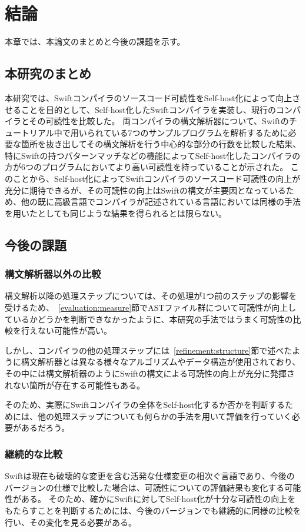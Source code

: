 \chapter{結論}
\label{conclusion}

本章では、本論文のまとめと今後の課題を示す。

\section{本研究のまとめ}

本研究では、Swiftコンパイラのソースコード可読性をSelf-host化によって向上させることを目的として、Self-host化したSwiftコンパイラを実装し、現行のコンパイラとその可読性を比較した。
両コンパイラの構文解析器について、Swiftのチュートリアル中で用いられている7つのサンプルプログラムを解析するために必要な箇所を抜き出してその構文解析を行う中心的な部分の行数を比較した結果、特にSwiftの持つパターンマッチなどの機能によってSelf-host化したコンパイラの方が6つのプログラムにおいてより高い可読性を持っていることが示された。
このことから、Self-host化によってSwiftコンパイラのソースコード可読性の向上が充分に期待できるが、その可読性の向上はSwiftの構文が主要因となっているため、他の既に高級言語でコンパイラが記述されている言語においては同様の手法を用いたとしても同じような結果を得られるとは限らない。

\section{今後の課題}

\subsection{構文解析器以外の比較}

構文解析以降の処理ステップについては、その処理が1つ前のステップの影響を受けるため、~\ref{evaluation:measure}節でASTファイル群について可読性が向上しているかどうかを判断できなかったように、本研究の手法ではうまく可読性の比較を行えない可能性が高い。

しかし、コンパイラの他の処理ステップには~\ref{refinement:structure}節で述べたように構文解析器とは異なる様々なアルゴリズムやデータ構造が使用されており、その中には構文解析器のようにSwiftの構文による可読性の向上が充分に発揮されない箇所が存在する可能性もある。

そのため、実際にSwiftコンパイラの全体をSelf-host化するか否かを判断するためには、他の処理ステップについても何らかの手法を用いて評価を行っていく必要があるだろう。

\subsection{継続的な比較}

Swiftは現在も破壊的な変更を含む活発な仕様変更の相次ぐ言語であり、今後のバージョンの仕様で比較した場合は、可読性についての評価結果も変化する可能性がある。
そのため、確かにSwiftに対してSelf-host化が十分な可読性の向上をもたらすことを判断するためには、今後のバージョンでも継続的に同様の比較を行い、その変化を見る必要がある。

